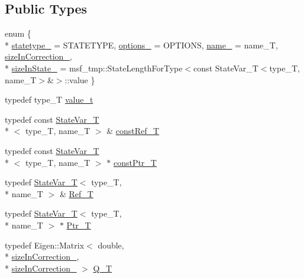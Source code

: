 \subsection*{Public Types}
\begin{DoxyCompactItemize}
\item 
enum \{ \\*
\hyperlink{structmsf__core_1_1StateVar__T_a4c4dbb9fb688dffcb86c1a2f5ea7ac3ea95f78b7f121c76d8bcb6ed1be9405e9a}{statetype\-\_\-} =  S\-T\-A\-T\-E\-T\-Y\-P\-E, 
\hyperlink{structmsf__core_1_1StateVar__T_a4c4dbb9fb688dffcb86c1a2f5ea7ac3eae9d831197f62b0f4f15b39ba8d0624e8}{options\-\_\-} =  O\-P\-T\-I\-O\-N\-S, 
\hyperlink{structmsf__core_1_1StateVar__T_a4c4dbb9fb688dffcb86c1a2f5ea7ac3ea312cc9b9c04d8a6af83fccf981ef2e99}{name\-\_\-} =  name\-\_\-\-T, 
\hyperlink{structmsf__core_1_1StateVar__T_a4c4dbb9fb688dffcb86c1a2f5ea7ac3eaafba5fac8b93bd4155c03a70a6d6c9b4}{size\-In\-Correction\-\_\-}, 
\\*
\hyperlink{structmsf__core_1_1StateVar__T_a4c4dbb9fb688dffcb86c1a2f5ea7ac3eaa823d4aa1a204b1d47fa05e98dce06b9}{size\-In\-State\-\_\-} =  msf\-\_\-tmp\-:\-:State\-Length\-For\-Type$<$const State\-Var\-\_\-\-T$<$type\-\_\-\-T, name\-\_\-\-T$>$\&$>$\-:\-:value
 \}
\item 
typedef type\-\_\-\-T \hyperlink{structmsf__core_1_1StateVar__T_a4b17a26648ef87fe426df62f973e1b16}{value\-\_\-t}
\item 
typedef const \hyperlink{structmsf__core_1_1StateVar__T}{State\-Var\-\_\-\-T}\\*
$<$ type\-\_\-\-T, name\-\_\-\-T $>$ \& \hyperlink{structmsf__core_1_1StateVar__T_aebeaee6c5d4290fae59c3d19bf98db38}{const\-Ref\-\_\-\-T}
\item 
typedef const \hyperlink{structmsf__core_1_1StateVar__T}{State\-Var\-\_\-\-T}\\*
$<$ type\-\_\-\-T, name\-\_\-\-T $>$ $\ast$ \hyperlink{structmsf__core_1_1StateVar__T_a0130c540891e011606bcd90e9bec6142}{const\-Ptr\-\_\-\-T}
\item 
typedef \hyperlink{structmsf__core_1_1StateVar__T}{State\-Var\-\_\-\-T}$<$ type\-\_\-\-T, \\*
name\-\_\-\-T $>$ \& \hyperlink{structmsf__core_1_1StateVar__T_a96f0d72b7d31d6a33954400f53f4570d}{Ref\-\_\-\-T}
\item 
typedef \hyperlink{structmsf__core_1_1StateVar__T}{State\-Var\-\_\-\-T}$<$ type\-\_\-\-T, \\*
name\-\_\-\-T $>$ $\ast$ \hyperlink{structmsf__core_1_1StateVar__T_a735b254ba24acec4b93ec43253862ab9}{Ptr\-\_\-\-T}
\item 
typedef Eigen\-::\-Matrix$<$ double, \\*
\hyperlink{structmsf__core_1_1StateVar__T_a4c4dbb9fb688dffcb86c1a2f5ea7ac3eaafba5fac8b93bd4155c03a70a6d6c9b4}{size\-In\-Correction\-\_\-}, \\*
\hyperlink{structmsf__core_1_1StateVar__T_a4c4dbb9fb688dffcb86c1a2f5ea7ac3eaafba5fac8b93bd4155c03a70a6d6c9b4}{size\-In\-Correction\-\_\-} $>$ \hyperlink{structmsf__core_1_1StateVar__T_a1f30ac85f0fd4307e50fd16377976626}{Q\-\_\-\-T}
\end{DoxyCompactItemize}
